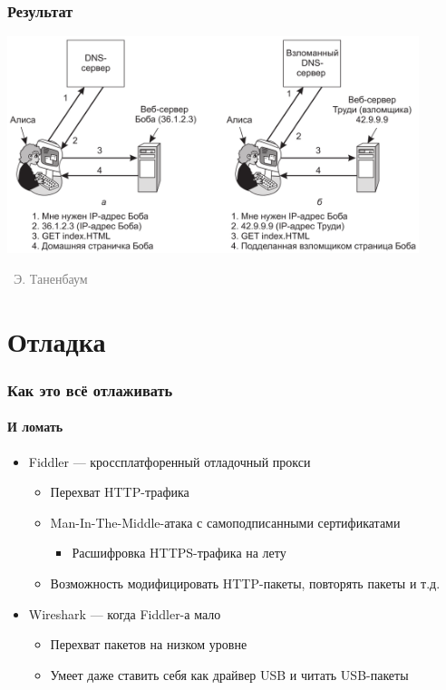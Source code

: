 \documentclass[xetex,mathserif,serif]{beamer}
\newcommand{\attribution}[1] {
\vspace{-5mm}\begin{flushright}\begin{scriptsize}\textcolor{gray}{\textcopyright\, #1}\end{scriptsize}\end{flushright}
}
\begin{document}
	\begin{frame}
		\frametitle{Результат}
		\begin{center}
			\includegraphics[width=0.9\textwidth]{dnsSpoofingResult.png}
			\attribution{Э. Таненбаум}
		\end{center}
	\end{frame}

	\section{Отладка}

	\begin{frame}
		\frametitle{Как это всё отлаживать}
		\framesubtitle{И ломать}
		\begin{itemize}
			\item Fiddler --- кроссплатфоренный отладочный прокси
			\begin{itemize}
				\item Перехват HTTP-трафика
				\item Man-In-The-Middle-атака с самоподписанными сертификатами
				\begin{itemize}
					\item Расшифровка HTTPS-трафика на лету
				\end{itemize}
				\item Возможность модифицировать HTTP-пакеты, повторять пакеты и т.д.
			\end{itemize}
			\item Wireshark --- когда Fiddler-а мало
			\begin{itemize}
				\item Перехват пакетов на низком уровне
				\item Умеет даже ставить себя как драйвер USB и читать USB-пакеты
			\end{itemize}
		\end{itemize}
	\end{frame}
\end{document}
